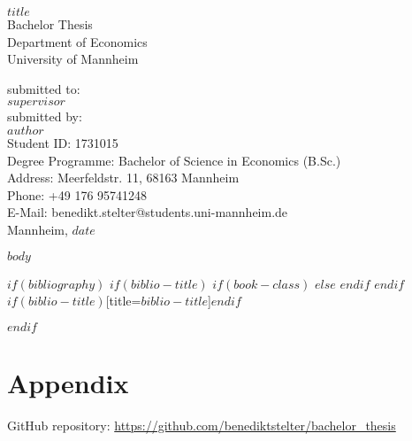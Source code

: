 \documentclass{scrbook}
\begin{document}
	
\frontmatter
\begin{titlepage}

\begin{center}

\vspace*{1,2cm}

\huge {\bfseries $title$}\\[1.8cm]

\Large {Bachelor Thesis}\\[1cm]

\large {Department of Economics}\\[0.2cm]

\large {University of Mannheim}\\[0.5cm]

\end{center}

\vfill

\noindent submitted to:\\
$supervisor$\\[1cm]
submitted by:\\
$author$\\[1cm]
Student ID: 1731015\\
Degree Programme: Bachelor of Science in Economics (B.Sc.)\\[1cm]
Address: Meerfeldstr. 11, 68163 Mannheim\\
Phone: +49 176 95741248\\
E-Mail: benedikt.stelter@students.uni-mannheim.de\\[1cm]
Mannheim, $date$

\setcounter{page}{0}

\end{titlepage}

  \tableofcontents


\listoffigures

\listoftables


\mainmatter

$body$


 
\backmatter


 
$if(bibliography)$
$if(biblio-title)$
$if(book-class)$
\renewcommand\bibname{$biblio-title$}
$else$
\renewcommand\refname{$biblio-title$}
$endif$
$endif$
\printbibliography$if(biblio-title)$[title=$biblio-title$]$endif$

$endif$
\chapter{Appendix}
GitHub repository: \url{https://github.com/benediktstelter/bachelor_thesis}
\end{document}
